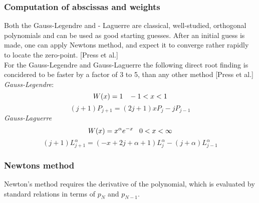 \documentclass[%
reprint,
amsmath,amssymb,
aps,
]{revtex4-1}
\begin{document}
\subsubsection{Computation of abscissas and weights}
Both the Gauss-Legendre and - Laguerre are classical, well-studied, orthogonal polynomials and can be used as good starting guesses. After an initial guess is made, one can apply Newtons method, and expect  it to converge rather rapidly to locate the zero-point. [Press et al.] \\
For the Gauss-Legendre and Gauss-Laguerre the following direct root finding is concidered to be faster by a factor of 3 to 5, than any other method [Press et al.]\\
\textit{Gauss-Legendre}:
\begin{equation*}
	W(x) = 1 \hspace{3mm} -1 < x < 1 
\end{equation*}
\begin{equation}
	(j+1)P_{j+1} = (2j +1)xP_j - jP_{j-1}
\end{equation}
\textit{Gauss-Laguerre}
\begin{equation*}
W(x) = x^\alpha e^{-x} \hspace{3mm} 0 < x < \infty 
\end{equation*}
\begin{equation}
(j+1)L_{j+1}^\alpha = (-x+2j+\alpha+1)L_j^\alpha -(j+\alpha)L_{j-1}^\alpha
\end{equation}
\subsubsection{Newtons method}
Newton's method requires the derivative of the polynomial, which is evaluated by standard relations in terms of $p_N$ and $p_{N-1}$. 
\end{document}
